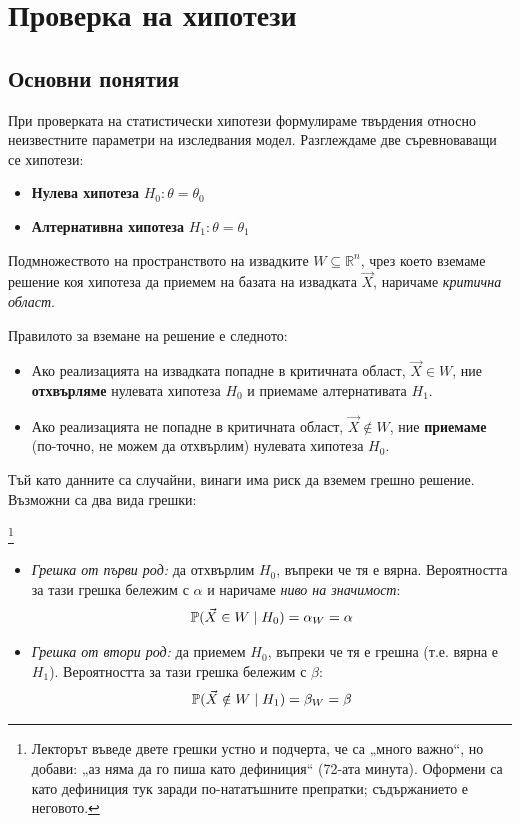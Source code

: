 \section{Проверка на хипотези}
\subsection{Основни понятия}
При проверката на статистически хипотези формулираме твърдения относно неизвестните параметри на изследвания модел. Разглеждаме две съревноваващи се хипотези:
\begin{itemize}
    \item \textbf{Нулева хипотеза} $H_0: \theta = \theta_0$
    \item \textbf{Алтернативна хипотеза} $H_1: \theta = \theta_1$
\end{itemize}
\begin{defn}\label{def:critical-region}
Подмножеството на пространството на извадките $W \subseteq \mathbb{R}^n$, чрез което вземаме решение коя хипотеза да приемем на базата на извадката $\vec{X}$, наричаме \emph{критична област}.
\end{defn}

Правилото за вземане на решение е следното:
\begin{itemize}
    \item Ако реализацията на извадката попадне в критичната област, $\vec{X} \in W$, ние \textbf{отхвърляме} нулевата хипотеза $H_0$ и приемаме алтернативата $H_1$.
    \item Ако реализацията не попадне в критичната област, $\vec{X} \notin W$, ние \textbf{приемаме} (по-точно, не можем да отхвърлим) нулевата хипотеза $H_0$.
\end{itemize}

Тъй като данните са случайни, винаги има риск да вземем грешно решение. Възможни са два вида грешки:

\begin{defn}\footnote{Лекторът въведе двете грешки устно и подчерта, че са „много важно“, но добави: „аз няма да го пиша като дефиниция“ (72-ата минута). Оформени са като дефиниция тук заради по-нататъшните препратки; съдържанието е неговото.}\label{def:errors}
\begin{itemize}
    \item \emph{Грешка от първи род:} да отхвърлим $H_0$, въпреки че тя е вярна. Вероятността за тази грешка бележим с $\alpha$ и наричаме \emph{ниво на значимост}:
    \[
    \mathbb{P}(\vec{X} \in W \mid H_0) = \alpha_W = \alpha
    \]
    \item \emph{Грешка от втори род:} да приемем $H_0$, въпреки че тя е грешна (т.е. вярна е $H_1$). Вероятността за тази грешка бележим с $\beta$:
    \[
    \mathbb{P}(\vec{X} \notin W \mid H_1) = \beta_W = \beta
    \]
\end{itemize}
\end{defn}

